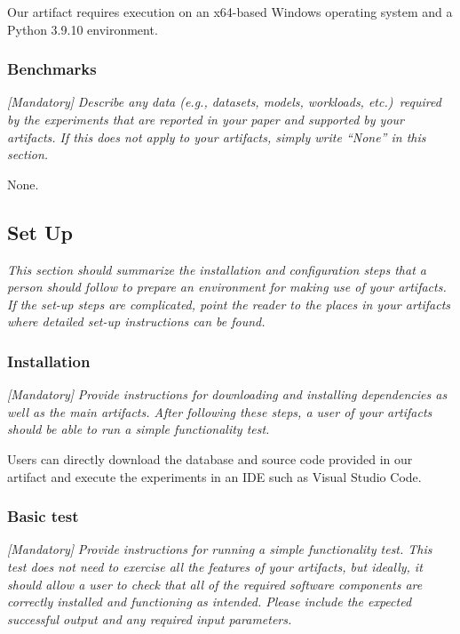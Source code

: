 \documentclass[sigconf]{acmart}
\begin{document}
Our artifact requires execution on an x64-based Windows operating system and a Python 3.9.10 environment.


\subsubsection{Benchmarks}

\emph{[Mandatory]}
%
\emph{Describe any data (e.g., datasets, models, workloads,
etc.)\ required by the experiments that are reported in your paper and
supported by your artifacts.  If this does not apply to your
artifacts, simply write ``None'' in this section.}

None.

\subsection{Set Up}

\emph{This section should summarize the installation and configuration
steps that a person should follow to prepare an environment for making
use of your artifacts.  If the set-up steps are complicated, point the
reader to the places in your artifacts where detailed set-up
instructions can be found.}


\subsubsection{Installation}

\emph{[Mandatory]}
%
\emph{Provide instructions for downloading and installing dependencies
as well as the main artifacts.  After following these steps, a user of
your artifacts should be able to run a simple functionality test.}

Users can directly download the database and source code provided in our artifact and execute the experiments in an IDE such as Visual Studio Code.

\subsubsection{Basic test}

\emph{[Mandatory]}
%
\emph{Provide instructions for running a simple functionality test.
This test does not need to exercise all the features of your
artifacts, but ideally, it should allow a user to check that all of
the required software components are correctly installed and
functioning as intended.  Please include the expected successful
output and any required input parameters.}
\end{document}
